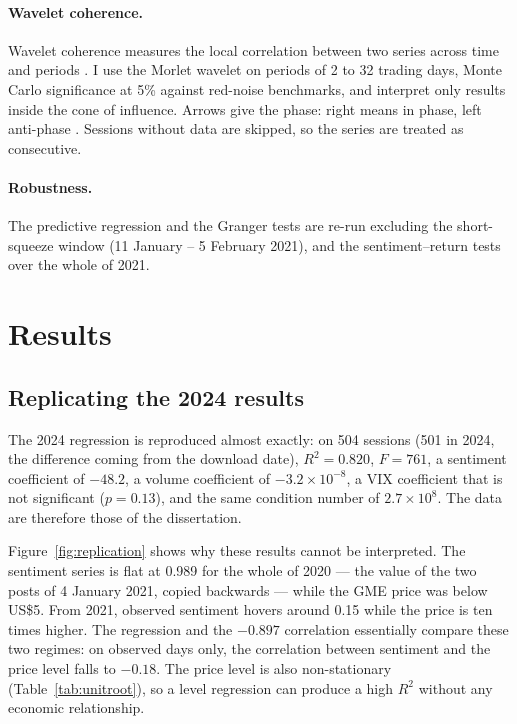\documentclass[11pt,a4paper]{article}
\begin{document}
\paragraph{Wavelet coherence.}\label{sec:wavelet} Wavelet coherence measures the
local correlation between two series across time and periods
\citep{torrence1998,grinsted2004}. I use the Morlet wavelet on periods of 2 to 32
trading days, Monte Carlo significance at 5\% against red-noise benchmarks, and
interpret only results inside the cone of influence. Arrows give the phase:
right means in phase, left anti-phase \citep{aguiar2014}. Sessions without data
are skipped, so the series are treated as consecutive.

\paragraph{Robustness.} The predictive regression and the Granger tests are
re-run excluding the short-squeeze window (11 January -- 5 February 2021), and
the sentiment--return tests over the whole of 2021.

\section{Results}\label{sec:results}

\subsection{Replicating the 2024 results}\label{sec:replication}

The 2024 regression is reproduced almost exactly: on 504 sessions (501 in 2024,
the difference coming from the download date), $R^2=0.820$, $F=761$, a sentiment
coefficient of $-48.2$, a volume coefficient of $-3.2\times10^{-8}$, a VIX
coefficient that is not significant ($p=0.13$), and the same condition number of
$2.7\times10^{8}$. The data are therefore those of the dissertation.

Figure~\ref{fig:replication} shows why these results cannot be interpreted. The
sentiment series is flat at 0.989 for the whole of 2020 --- the value of the two
posts of 4 January 2021, copied backwards --- while the GME price was below US\$5.
From 2021, observed sentiment hovers around 0.15 while the price is ten times
higher. The regression and the $-0.897$ correlation essentially compare these two
regimes: on observed days only, the correlation between sentiment and the price
level falls to $-0.18$. The price level is also non-stationary
(Table~\ref{tab:unitroot}), so a level regression can produce a high $R^2$ without
any economic relationship.
\end{document}
